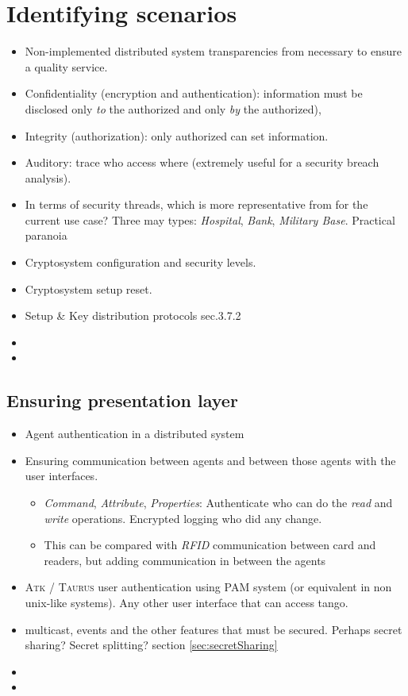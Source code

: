 \documentclass[10pt,a4paper,twoside]{llncs}
\newcommand{\taurus}{\textsc{Taurus} }
\newcommand{\atk}{\textsc{Atk} }
\begin{document}
%
\section{Identifying scenarios \label{sec:scenarios}}

\begin{itemize}
 \item Non-implemented distributed system transparencies from \cite{TanenbaumDistr} necessary to ensure a quality service.
 \item Confidentiality (encryption and authentication): information must be disclosed only \emph{to} the authorized and only \emph{by} the authorized),
 \item Integrity (authorization): only authorized can set information.
 \item Auditory: trace who access where (extremely useful for a security breach analysis).
 \item In terms of security threads, which is more representative from \cite{SecEngRossAnderson} for the current use case? Three may types: \emph{Hospital}, \emph{Bank}, \emph{Military Base}. Practical paranoia \cite{PractCryptoSchneier}
 \item Cryptosystem configuration and security levels.
 \item Cryptosystem setup reset.
 \item Setup \& Key distribution protocols \cite{SecEngRossAnderson} sec.3.7.2
 \item 
 \item 
\end{itemize}

%
\subsection{Ensuring presentation layer \label{sec:presentationLayer}}

\begin{itemize}
 \item Agent authentication in a distributed system
 \item Ensuring communication between agents and between those agents with the user interfaces.
 \begin{itemize}
  \item \emph{Command}, \emph{Attribute}, \emph{Properties}: Authenticate who can do the \emph{read} and \emph{write} operations. Encrypted logging who did any change.
  \item This can be compared with \emph{RFID} communication between card and readers, but adding communication in between the agents
 \end{itemize}
 \item \atk/ \taurus user authentication using PAM system (or equivalent in non unix-like systems). Any other user interface that can access tango.
 \item multicast, events and the other features that must be secured. Perhaps secret sharing? Secret splitting? section \ref{sec:secretSharing}
 \item 
 \item 
\end{itemize}
\end{document}
